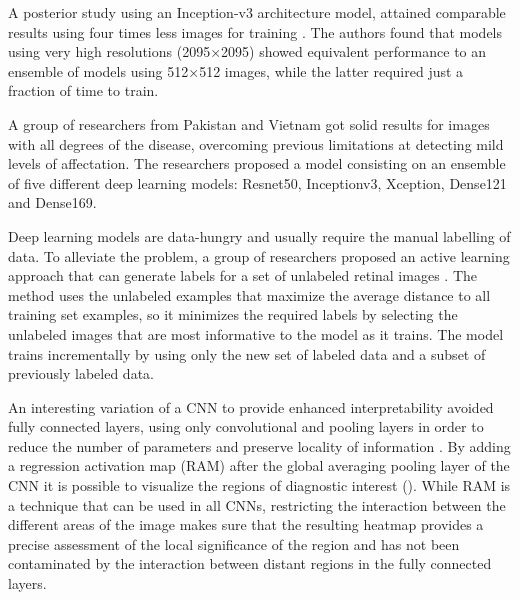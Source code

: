 A posterior study using an Inception-v3 architecture model, attained comparable results using four times less images for training \cite{sahlsten2019deep}. The authors found that models using very high resolutions (2095×2095) showed equivalent performance to an ensemble of models using 512×512 images, while the latter required just a fraction of time to train. 

A group of researchers from Pakistan and Vietnam \cite{qummar2019deep} got solid results for images with all degrees of the disease, overcoming previous limitations at detecting mild levels of affectation. The researchers proposed a model consisting on an ensemble of five different deep learning models: Resnet50, Inceptionv3, Xception, Dense121 and Dense169.

Deep learning models are data-hungry and usually require the manual labelling of data. To alleviate the problem, a group of researchers proposed an active learning approach that can generate labels for a set of unlabeled retinal images \cite{smailagic2020omedal}. The method uses the unlabeled examples that maximize the average distance to all training set examples, so it minimizes the required labels by selecting the unlabeled images that are most informative to the model as it trains. The model trains incrementally by using only the new set of labeled data and a subset of previously labeled data. 

An interesting variation of a CNN to provide enhanced interpretability avoided fully connected layers, using only convolutional and pooling layers in order to reduce the number of parameters and preserve locality of information \cite{wang2017diabetic}. By adding a regression activation map (RAM) after the global averaging pooling layer of the CNN it is possible to visualize the regions of diagnostic interest (). While RAM is a technique that can be used in all CNNs, restricting the interaction between the different areas of the image makes sure that the resulting heatmap provides a precise assessment of the local significance of the region and has not been contaminated by the interaction between distant regions in the fully connected layers.

